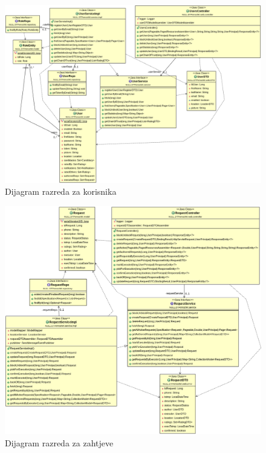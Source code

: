 			\begin{figure}[H]
				\includegraphics[scale=0.4]{slike/userDiag.png} %
				\centering
				\caption { Dijagram razreda za korisnika}
				\label{fig:4.6}
			\end{figure}
			
			\begin{figure}[H]
				\includegraphics[scale=0.45]{slike/reqDiag.png} %
				\centering
				\caption { Dijagram razreda za zahtjeve}
				\label{fig:4.7}
			\end{figure}
			
